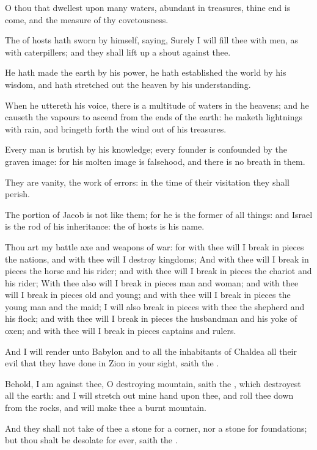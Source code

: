 \verse O thou that dwellest upon many waters, abundant in treasures, thine end is come, and the measure of thy covetousness.

\verse The \LORD of hosts hath sworn by himself, saying, Surely I will fill thee with men, as with caterpillers; and they shall lift up a shout against thee.

\verse He hath made the earth by his power, he hath established the world by his wisdom, and hath stretched out the heaven by his understanding.

\verse When he uttereth his voice, there is a multitude of waters in the heavens; and he causeth the vapours to ascend from the ends of the earth: he maketh lightnings with rain, and bringeth forth the wind out of his treasures.

\verse Every man is brutish by his knowledge; every founder is confounded by the graven image: for his molten image is falsehood, and there is no breath in them.

\verse They are vanity, the work of errors: in the time of their visitation they shall perish.

\verse The portion of Jacob is not like them; for he is the former of all things: and Israel is the rod of his inheritance: the \LORD of hosts is his name.

\verse Thou art my battle axe and weapons of war: for with thee will I break in pieces the nations, and with thee will I destroy kingdoms; \verse And with thee will I break in pieces the horse and his rider; and with thee will I break in pieces the chariot and his rider; \verse With thee also will I break in pieces man and woman; and with thee will I break in pieces old and young; and with thee will I break in pieces the young man and the maid; \verse I will also break in pieces with thee the shepherd and his flock; and with thee will I break in pieces the husbandman and his yoke of oxen; and with thee will I break in pieces captains and rulers.

\verse And I will render unto Babylon and to all the inhabitants of Chaldea all their evil that they have done in Zion in your sight, saith the \LORD.

\verse Behold, I am against thee, O destroying mountain, saith the \LORD, which destroyest all the earth: and I will stretch out mine hand upon thee, and roll thee down from the rocks, and will make thee a burnt mountain.

\verse And they shall not take of thee a stone for a corner, nor a stone for foundations; but thou shalt be desolate for ever, saith the \LORD.

